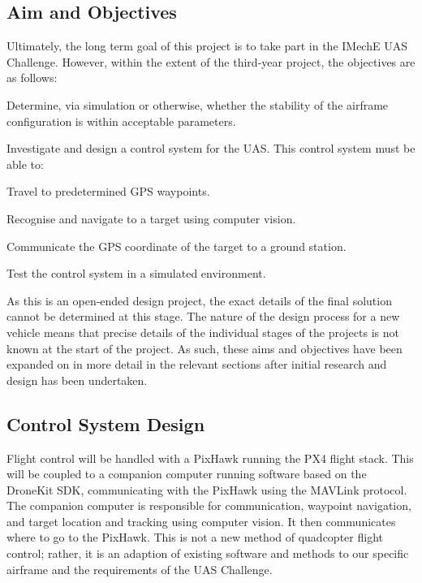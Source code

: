 \documentclass[11pt,twoside]{article}
\begin{document}
\subsection{Aim and Objectives}
Ultimately, the long term goal of this project is to take part in the IMechE UAS Challenge. However, within the extent of the third-year project, the objectives are as follows:

\begin{compactenum}
    \item Determine, via simulation or otherwise, whether the stability of the airframe configuration is within acceptable parameters.
    \item Investigate and design a control system for the UAS. This control system must be able to:
    \begin{compactenum}
        \item Travel to predetermined GPS waypoints.
        \item Recognise and navigate to a target using computer vision.
        \item Communicate the GPS coordinate of the target to a ground station.
    \end{compactenum}
    \item Test the control system in a simulated environment.
\end{compactenum}


As this is an open-ended design project, the exact details of the final solution cannot be determined at this stage. The nature of the design process for a new vehicle means that precise details of the individual stages of the projects is not known at the start of the project.
As such, these aims and objectives have been expanded on in more detail in the relevant sections after initial research and design has been undertaken.

\subsection{Control System Design}
Flight control will be handled with a PixHawk running the PX4 flight stack. This will be coupled to a companion computer running software based on the DroneKit SDK, communicating with the PixHawk using the MAVLink protocol. The companion computer is responsible for communication, waypoint navigation, and target location and tracking using computer vision. It then communicates where to go to the PixHawk. This is not a new method of quadcopter flight control; rather, it is an adaption of existing software and methods to our specific airframe and the requirements of the UAS Challenge.
\end{document}
